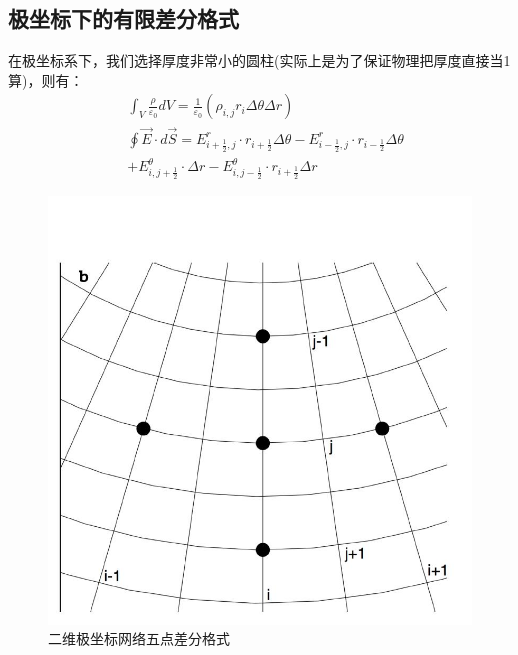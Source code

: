 \documentclass[twoside,twocolumn]{article}
\begin{document}
\begin{CJK*}{UTF8}{gkai}
	\subsection{极坐标下的有限差分格式}
	在极坐标系下，我们选择厚度非常小的圆柱(实际上是为了保证物理把厚度直接当1算)，则有：
	\begin{equation*}
	\begin{aligned}
		&\int_{V}\frac{\rho}{\varepsilon_{0}}dV=\frac{1}{\varepsilon_{0}}(\rho_{i,j}r_{i}\Delta \theta\Delta r)\\
		&\oint\vec{E}\cdot d\vec{S}=E_{i+\frac{1}{2},j}^{r}\cdot r_{i+\frac{1}{2}}\Delta \theta-E_{i-\frac{1}{2},j}^{r}\cdot r_{i-\frac{1}{2}}\Delta \theta\\
		&+E_{i,j+\frac{1}{2}}^{\theta}\cdot \Delta r-E_{i,j-\frac{1}{2}}^{\theta}\cdot r_{i+\frac{1}{2}}\Delta r
	\end{aligned}
	\end{equation*}
	\begin{figure}[h]
	\centering
	\includegraphics[width=0.8\linewidth]{figure/figure3}
	\caption{二维极坐标网络五点差分格式}
	\label{fig:figure3}
	\end{figure}
	

\end{CJK*}
\end{document}
